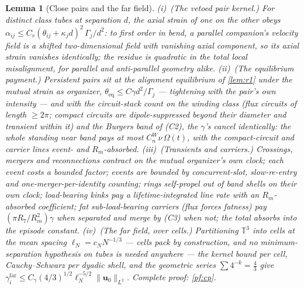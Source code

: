 \documentclass[11pt,letterpaper]{amsart}
\newtheorem{lemma}[theorem]{Lemma}
\theoremstyle{definition}
\theoremstyle{remark}
\newcommand{\TT}{\mathbb{T}}
\newcommand{\uu}{\boldsymbol{u}}
\newcommand{\norm}[1]{\lVert #1 \rVert}
\begin{document}
\begin{lemma}[Close pairs and the far field]\label{lem:cp}
\textup{(i)}~\emph{(The vetoed pair kernel.)} For distinct class tubes at separation
$d$, the axial strain of one on the other obeys
$\alpha_{ij}\le C_v(\theta_{ij}+\kappa_jd)^2\,\Gamma_j/d^2$: to first order in bend, a
parallel companion's velocity field is a shifted two-dimensional field with vanishing
axial component, so its axial strain vanishes \emph{identically}; the residue is
quadratic in the total local misalignment, for parallel and anti-parallel geometry
alike. \textup{(ii)}~\emph{(The equilibrium payment.)} Persistent pairs sit at the
alignment equilibrium of \cref{lem:r1} under the \emph{mutual} strain as organizer,
$\theta_{\mathrm{eq}}\le C\gamma d^2/\Gamma_j$ --- tightening with the pair's own
intensity --- and with the circuit-stack count on the winding class (flux
circuits of length $\ge2\pi$; compact circuits are dipole-suppressed beyond
their diameter and transient within it) and the Burgers band of
\textup{(C2)}, the $\gamma$'s cancel identically: the whole standing near band
pays at most $C_n^{W}\nu\,\Omega(t)$, with the compact-circuit and carrier
lines event- and $R_m$-absorbed. \textup{(iii)}~\emph{(Transients and carriers.)} Crossings, mergers and
reconnections contract on the mutual organizer's own clock; each event costs a
bounded factor; events are bounded by concurrent-slot, slow-re-entry and
one-merger-per-identity counting; rings self-propel out of band shells on their
own clock; load-bearing kinks pay a lifetime-integrated line rate with an
$R_m$-absorbed coefficient; fat sub-load-bearing carriers (flux forces fatness)
pay $(\pi R_7/R_m^2)\gamma$ when separated and merge by \textup{(C3)} when not;
the total absorbs into the episode constant.
\textup{(iv)}~\emph{(The far field, over cells.)} Partitioning $\TT^3$ into cells at
the mean spacing $\ell_N=c_NN^{-1/3}$ --- cells pack by construction, and no
minimum-separation hypothesis on tubes is needed anywhere --- the kernel bound
per cell, Cauchy--Schwarz per dyadic shell, and the geometric series
$\sum4^{-k}=\tfrac43$ give
$\gamma^{\mathrm{far}}_i\le C_\gamma(4/3)^{1/2}\ell_N^{-5/2}\norm{\uu_0}_{L^2}$.
Complete proof: \cref{pf:cp}.
\end{lemma}
\end{document}
